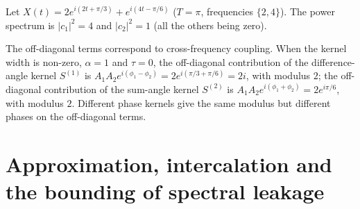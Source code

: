 \begin{example}\label{ex:spectrum_family}
Let $X(t) = 2e^{i(2t + \pi/3)} + e^{i(4t - \pi/6)}$ ($T = \pi$, frequencies $\{2, 4\}$). The power spectrum is $|c_1|^2 = 4$ and $|c_2|^2 = 1$ (all the others being zero).

The off-diagonal terms correspond to cross-frequency coupling. When the kernel width is non-zero, $\alpha = 1$ and $\tau = 0$, the off-diagonal contribution of the difference-angle kernel $S^{(1)}$ is $A_1 A_2 e^{i(\phi_1 - \phi_2)} = 2 e^{i(\pi/3 + \pi/6)} = 2i$, with modulus $2$; the off-diagonal contribution of the sum-angle kernel $S^{(2)}$ is $A_1 A_2 e^{i(\phi_1 + \phi_2)} = 2e^{i\pi/6}$, with modulus $2$. Different phase kernels give the same modulus but different phases on the off-diagonal terms.
\end{example}

\section{\texorpdfstring{Approximation, intercalation and the bounding of spectral leakage}{Approximation, intercalation and the bounding of spectral leakage}}\label{sec:intercalation_spectral_leakage}


